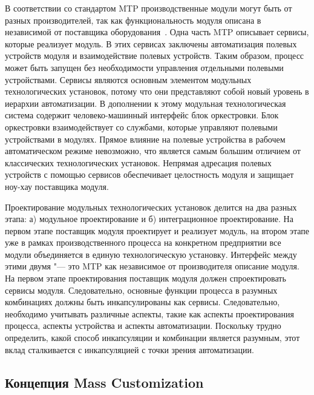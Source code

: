 В соответствии со стандартом MTP производственные модули могут быть от разных производителей, так как функциональность модуля описана в независимой от поставщика оборудования~\cite{bloch2018state}. Одна часть MTP описывает сервисы, которые реализует модуль. В этих сервисах заключены автоматизация полевых устройств модуля и взаимодействие полевых устройств. Таким образом, процесс может быть запущен без необходимости управления отдельными полевыми устройствами. Сервисы являются основным элементом модульных технологических установок, потому что они представляют собой новый уровень в иерархии автоматизации. В дополнении к этому модульная технологическая система содержит человеко-машинный интерфейс блок оркестровки. Блок оркестровки взаимодействует со службами, которые управляют полевыми устройствами в модулях. Прямое влияние на полевые устройства в рабочем автоматическом режиме невозможно, что является самым большим отличием от классических технологических установок. Непрямая адресация полевых устройств с помощью сервисов обеспечивает целостность модуля и защищает ноу-хау поставщика модуля.

Проектирование модульных технологических установок делится на два разных этапа: а) модульное проектирование и б) интеграционное проектирование. На первом этапе поставщик модуля проектирует и реализует модуль, на втором этапе уже в рамках производственного процесса на конкретном предприятии все модули объединяется в единую технологическую установку. Интерфейс между этими двумя "--- это MTP как независимое от производителя описание модуля. На первом этапе проектирования поставщик модуля должен спроектировать сервисы модуля. Следовательно, основные функции процесса в разумных комбинациях должны быть инкапсулированы как сервисы. Следовательно, необходимо учитывать различные аспекты, такие как аспекты проектирования процесса, аспекты устройства и аспекты автоматизации. Поскольку трудно определить, какой способ инкапсуляции и комбинации является разумным, этот вклад сталкивается с инкапсуляцией с точки зрения автоматизации.

\subsection{Концепция Mass Customization}

